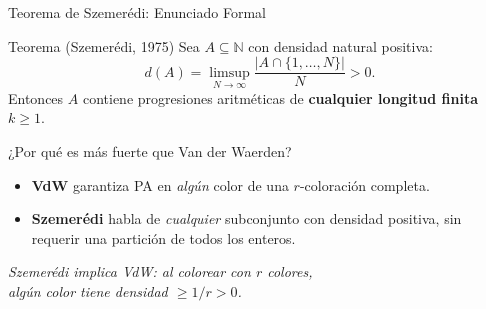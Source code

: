 \begin{frame}{Teorema de Szemerédi: Enunciado Formal}

    \begin{alertblock}{Teorema (Szemerédi, 1975)}
        Sea $A \subseteq \mathbb{N}$ con densidad natural positiva:
        \[
            d(A) = \limsup_{N\to\infty} \frac{|A\cap\{1,\ldots,N\}|}{N} > 0.
        \]
        Entonces $A$ contiene progresiones aritméticas de
        \textbf{cualquier longitud finita} $k \geq 1$.
    \end{alertblock}

    \pause
    \vspace{0.3cm}

    \begin{block}{¿Por qué es más fuerte que Van der Waerden?}
        \begin{itemize}
            \item \textbf{VdW} garantiza PA en \textit{algún} color
                  de una $r$-coloración completa.
            \item \textbf{Szemerédi} habla de \textit{cualquier}
                  subconjunto con densidad positiva, sin requerir
                  una partición de todos los enteros.
        \end{itemize}
    \end{block}

    \pause
    \vspace{0.15cm}
    \begin{center}
        \textit{Szemerédi implica VdW: al colorear con $r$ colores,\\
        algún color tiene densidad $\geq 1/r > 0$.}
    \end{center}

\end{frame}


